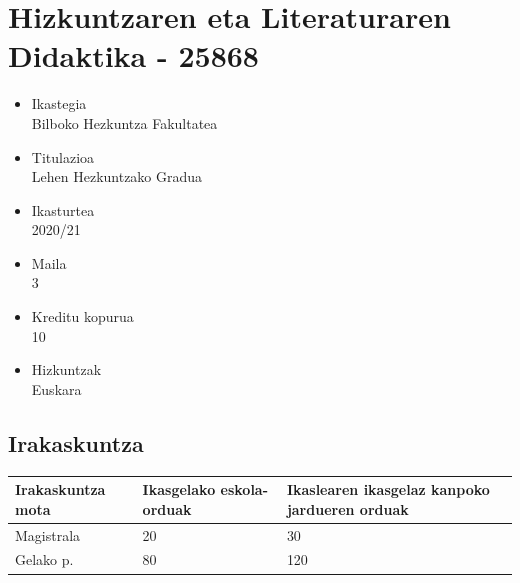 \documentclass[
]{book}
\begin{document}
\hypertarget{hizkuntzaren-eta-literaturaren-didaktika---25868}{%
\chapter*{Hizkuntzaren eta Literaturaren Didaktika - 25868}\label{hizkuntzaren-eta-literaturaren-didaktika---25868}}

\begin{itemize}
\item
  Ikastegia\\
  Bilboko Hezkuntza Fakultatea
\item
  Titulazioa\\
  Lehen Hezkuntzako Gradua
\item
  Ikasturtea\\
  2020/21
\item
  Maila\\
  3
\item
  Kreditu kopurua\\
  10
\item
  Hizkuntzak\\
  Euskara
\end{itemize}

\hypertarget{irakaskuntza}{%
\section*{Irakaskuntza}\label{irakaskuntza}}

\begin{longtable}[]{@{}lll@{}}
\toprule
\begin{minipage}[b]{0.18\columnwidth}\raggedright
Irakaskuntza mota\strut
\end{minipage} & \begin{minipage}[b]{0.25\columnwidth}\raggedright
Ikasgelako eskola-orduak\strut
\end{minipage} & \begin{minipage}[b]{0.48\columnwidth}\raggedright
Ikaslearen ikasgelaz kanpoko jardueren orduak\strut
\end{minipage}\tabularnewline
\midrule
\endhead
\begin{minipage}[t]{0.18\columnwidth}\raggedright
Magistrala\strut
\end{minipage} & \begin{minipage}[t]{0.25\columnwidth}\raggedright
20\strut
\end{minipage} & \begin{minipage}[t]{0.48\columnwidth}\raggedright
30\strut
\end{minipage}\tabularnewline
\begin{minipage}[t]{0.18\columnwidth}\raggedright
Gelako p.\strut
\end{minipage} & \begin{minipage}[t]{0.25\columnwidth}\raggedright
80\strut
\end{minipage} & \begin{minipage}[t]{0.48\columnwidth}\raggedright
120\strut
\end{minipage}\tabularnewline
\bottomrule
\end{longtable}
\end{document}
